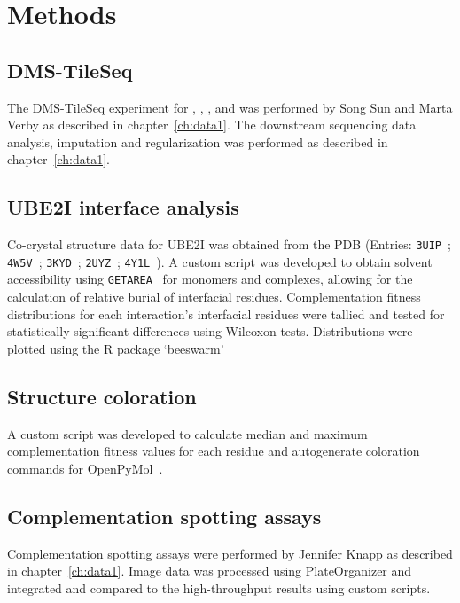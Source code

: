 \section{Methods}

\subsection{DMS-TileSeq}
The DMS-TileSeq experiment for , , , and  was performed by Song Sun and Marta Verby as described in chapter~\ref{ch:data1}. The downstream sequencing data analysis, imputation and regularization was performed as described in chapter~\ref{ch:data1}.

\subsection{UBE2I interface analysis}
Co-crystal structure data for UBE2I was obtained from the PDB (Entries: \texttt{3UIP}~\cite{gareau_determinants_2012}; \texttt{4W5V}~\cite{reiter_characterization_2016}; \texttt{3KYD}~\cite{olsen_active_2010}; \texttt{2UYZ}~\cite{knipscheer_noncovalent_2007}; \texttt{4Y1L}~\cite{alontaga_rwd_2015}). A custom script was developed to obtain solvent accessibility using \texttt{GETAREA}~\cite{fraczkiewicz_exact_1998} for monomers and complexes, allowing for the calculation of relative burial of interfacial residues. Complementation fitness distributions for each interaction's interfacial residues were tallied and tested for statistically significant differences using Wilcoxon tests. Distributions were plotted using the R package `beeswarm'~\cite{eklund_bee_2016}

\subsection{Structure coloration} A custom script was developed to calculate median and maximum complementation fitness values for each residue and autogenerate coloration commands for OpenPyMol~\cite{schrodinger_pymol_2016}. 

\subsection{Complementation spotting assays} Complementation spotting assays were performed by Jennifer Knapp as described in chapter~\ref{ch:data1}. Image data was processed using PlateOrganizer and integrated and compared to the high-throughput results using custom scripts.

